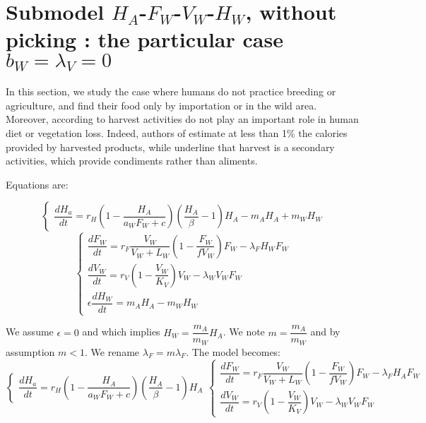 \documentclass{article}
\newcommand{\lfw}{\lambda_{F}}
\newcommand{\lvw}{\lambda_{V}}
\newcommand{\lfv}{\lambda_{W}}
\begin{document}
\section{Submodel $H_A$-$F_W$-$V_W$-$H_W$, without picking : the particular case $b_W = \lvw = 0$}
In this section, we study the case where humans do not practice breeding or agriculture, and find their food only by importation or in the wild area. Moreover, according to \cite{loung_pygmees_1996, koppert_consommation_1996,bennett_carrying_2000} harvest activities do not play an important role in human diet or vegetation loss. Indeed, authors of \cite{loung_pygmees_1996} estimate at less than 1\% the calories provided by harvested products, while \cite{koppert_consommation_1996, bennett_carrying_2000} underline that harvest is a secondary activities, which provide condiments rather than aliments.


Equations are:

\begin{equation*}
\left\lbrace \begin{array}{l}
\dfrac{dH_{a}}{dt}=r_{H}\left(1-\dfrac{H_A}{a_{W}F_{W}+c}\right)\left(\dfrac{H_{A}}{\beta}-1\right)H_{A} -m_A H_A + m_W H_W
\end{array} \right.
\end{equation*}
\begin{equation*}
\left\lbrace \begin{array}{l}
\dfrac{dF_W}{dt} = r_F \dfrac{V_W}{V_W + L_W} \left(1 - \dfrac{F_W}{f V_W}\right) F_W - \lfw H_W F_W\\
\dfrac{dV_W}{dt} = r_V \left(1 - \dfrac{V_W}{K_V}\right) V_W - \lfv V_W F_W \\
\epsilon \dfrac{dH_W}{dt} = m_A H_A - m_W H_W
\end{array} \right.
\end{equation*}


We assume $\epsilon = 0$ and which implies $H_W = \dfrac{m_A}{m_W}H_A$. We note $m = \dfrac{m_A}{m_W}$ and by assumption $m < 1$. We rename $\lfw = m \lfw$. The model becomes:
\begin{subequations}
\begin{equation}
\left\lbrace \begin{array}{l}
\dfrac{dH_{a}}{dt}=r_{H}\left(1-\dfrac{H_A}{a_{W}F_{W}+c}\right)\left(\dfrac{H_{A}}{\beta}-1\right)H_{A}
\end{array} \right.
\end{equation}
\begin{equation}
\left\lbrace \begin{array}{l}
\dfrac{dF_W}{dt} = r_F \dfrac{V_W}{V_W + L_W} \left(1 - \dfrac{F_W}{f V_W}\right) F_W - \lfw H_A F_W\\
\dfrac{dV_W}{dt} = r_V \left(1 - \dfrac{V_W}{K_V}\right) V_W - \lfv V_W F_W 
\end{array} \right.
\end{equation}
\label{anthropicWildHAFWVW}
\end{subequations}
\end{document}
